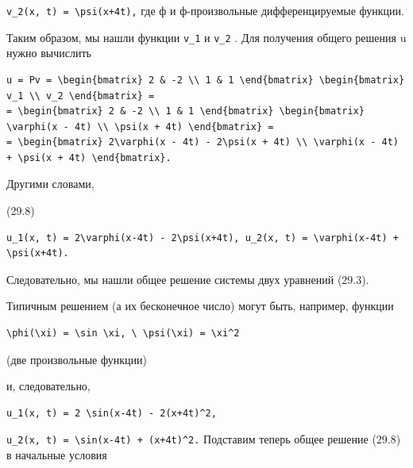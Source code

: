 \documentclass[
  ukrainian,
]{article}
\begin{document}
\texttt{v\_2(x,\ t)\ =\ \textbackslash{}psi(x+4t),} где ф и
ф-произвольные дифференцируемые функции.

Таким образом, мы нашли функции \texttt{v\_1} и \texttt{v\_2} . Для
получения общего решения u нужно вычислить

\begin{verbatim}
u = Pv = \begin{bmatrix} 2 & -2 \\ 1 & 1 \end{bmatrix} \begin{bmatrix} v_1 \\ v_2 \end{bmatrix} =
= \begin{bmatrix} 2 & -2 \\ 1 & 1 \end{bmatrix} \begin{bmatrix} \varphi(x - 4t) \\ \psi(x + 4t) \end{bmatrix} =
= \begin{bmatrix} 2\varphi(x - 4t) - 2\psi(x + 4t) \\ \varphi(x - 4t) + \psi(x + 4t) \end{bmatrix}.
\end{verbatim}

Другими словами,

(29.8)

\begin{verbatim}
u_1(x, t) = 2\varphi(x-4t) - 2\psi(x+4t), u_2(x, t) = \varphi(x-4t) + \psi(x+4t).
\end{verbatim}

Следовательно, мы нашли общее решение системы двух уравнений (29.3).

Типичным решением (а их бесконечное число) могут быть, например, функции

\begin{verbatim}
\phi(\xi) = \sin \xi, \ \psi(\xi) = \xi^2
\end{verbatim}

(две произвольные функции)

и, следовательно,

\begin{verbatim}
u_1(x, t) = 2 \sin(x-4t) - 2(x+4t)^2,
\end{verbatim}

\texttt{u\_2(x,\ t)\ =\ \textbackslash{}sin(x-4t)\ +\ (x+4t)\^{}2.}
Подставим теперь общее решение (29.8) в начальные условия
\end{document}
